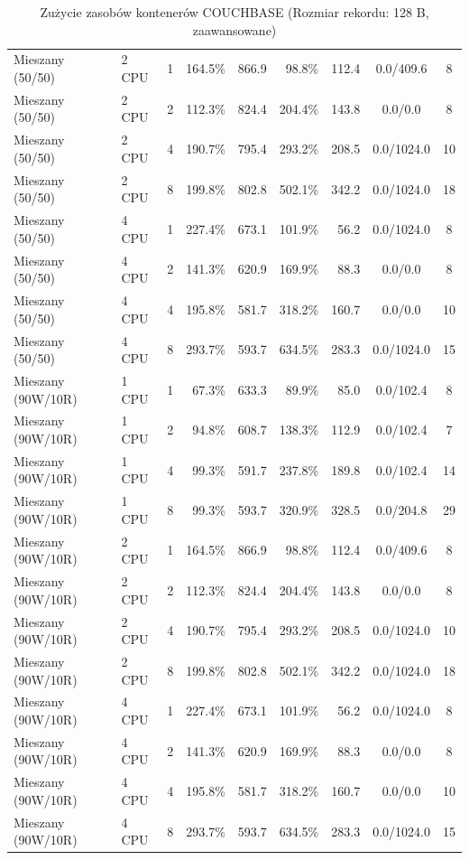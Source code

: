 \begin{table}[ht]
{\begin{tabular}{llcrrrrcc}
Mieszany (50/50) & 2 CPU & 1 & 164.5\% & 866.9 & 98.8\% & 112.4 & 0.0/409.6 & 8 \\
Mieszany (50/50) & 2 CPU & 2 & 112.3\% & 824.4 & 204.4\% & 143.8 & 0.0/0.0 & 8 \\
Mieszany (50/50) & 2 CPU & 4 & 190.7\% & 795.4 & 293.2\% & 208.5 & 0.0/1024.0 & 10 \\
Mieszany (50/50) & 2 CPU & 8 & 199.8\% & 802.8 & 502.1\% & 342.2 & 0.0/1024.0 & 18 \\
Mieszany (50/50) & 4 CPU & 1 & 227.4\% & 673.1 & 101.9\% & 56.2 & 0.0/1024.0 & 8 \\
Mieszany (50/50) & 4 CPU & 2 & 141.3\% & 620.9 & 169.9\% & 88.3 & 0.0/0.0 & 8 \\
Mieszany (50/50) & 4 CPU & 4 & 195.8\% & 581.7 & 318.2\% & 160.7 & 0.0/0.0 & 10 \\
Mieszany (50/50) & 4 CPU & 8 & 293.7\% & 593.7 & 634.5\% & 283.3 & 0.0/1024.0 & 15 \\
Mieszany (90W/10R) & 1 CPU & 1 & 67.3\% & 633.3 & 89.9\% & 85.0 & 0.0/102.4 & 8 \\
Mieszany (90W/10R) & 1 CPU & 2 & 94.8\% & 608.7 & 138.3\% & 112.9 & 0.0/102.4 & 7 \\
Mieszany (90W/10R) & 1 CPU & 4 & 99.3\% & 591.7 & 237.8\% & 189.8 & 0.0/102.4 & 14 \\
Mieszany (90W/10R) & 1 CPU & 8 & 99.3\% & 593.7 & 320.9\% & 328.5 & 0.0/204.8 & 29 \\
Mieszany (90W/10R) & 2 CPU & 1 & 164.5\% & 866.9 & 98.8\% & 112.4 & 0.0/409.6 & 8 \\
Mieszany (90W/10R) & 2 CPU & 2 & 112.3\% & 824.4 & 204.4\% & 143.8 & 0.0/0.0 & 8 \\
Mieszany (90W/10R) & 2 CPU & 4 & 190.7\% & 795.4 & 293.2\% & 208.5 & 0.0/1024.0 & 10 \\
Mieszany (90W/10R) & 2 CPU & 8 & 199.8\% & 802.8 & 502.1\% & 342.2 & 0.0/1024.0 & 18 \\
Mieszany (90W/10R) & 4 CPU & 1 & 227.4\% & 673.1 & 101.9\% & 56.2 & 0.0/1024.0 & 8 \\
Mieszany (90W/10R) & 4 CPU & 2 & 141.3\% & 620.9 & 169.9\% & 88.3 & 0.0/0.0 & 8 \\
Mieszany (90W/10R) & 4 CPU & 4 & 195.8\% & 581.7 & 318.2\% & 160.7 & 0.0/0.0 & 10 \\
Mieszany (90W/10R) & 4 CPU & 8 & 293.7\% & 593.7 & 634.5\% & 283.3 & 0.0/1024.0 & 15 \\
\bottomrule
\end{tabular}%
}
\caption{Zużycie zasobów kontenerów COUCHBASE (Rozmiar rekordu: 128 B, zaawansowane)}
\label{tab:resources_couchbase_small_0}
\end{table}
